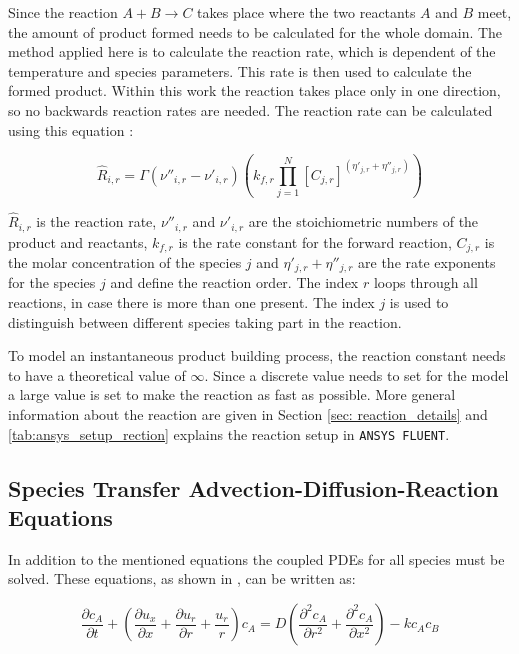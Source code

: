 \documentclass[../thesis.tex]{subfiles}
\begin{document}
Since the reaction $ A + B \rightarrow C$ takes place where the two reactants $A$ and $B$ meet, the amount of product formed needs to be calculated for the whole domain. The method applied here is to calculate the reaction rate, which is dependent of the temperature and species parameters. This rate is then used to calculate the formed product. Within this work the reaction takes place only in one direction, so no backwards reaction rates are needed. The reaction rate can be calculated using this equation \cite{manual2009ansys}:

\begin{equation}
\label{eqn:reaction}
\hat{R}_{i,r} = {\Gamma} \left(\nu''_{i,r} - \nu'_{i,r} \right) \left(k_{f,r} \prod_{j=1}^{N} \left[C_{j,r} \right]^{(\eta'_{j,r} + \eta''_{j,r})} \right) 
\end{equation}

$\hat{R}_{i,r}$ is the reaction rate, $\nu''_{i,r}$ and $\nu'_{i,r}$ are the stoichiometric numbers of the product and reactants, $k_{f,r}$ is the rate constant for the forward reaction, $C_{j,r}$ is the molar concentration of the species $j$ and $\eta'_{j,r} + \eta''_{j,r}$ are the rate exponents for the species $j$ and define the reaction order. 
The index $r$ loops through all reactions, in case there is more than one present. The index $j$ is used to distinguish between different species taking part in the reaction.

To model an instantaneous product building process, the reaction constant needs to have a theoretical value of $\infty$. Since a discrete value needs to set for the model a large value is set to make the reaction as fast as possible. More general information about the reaction are given in Section \ref{sec: reaction_details} and \autoref{tab:ansys_setup_rection} explains the reaction setup in \texttt{ANSYS FLUENT}. 

\subsection{Species Transfer Advection-Diffusion-Reaction Equations}

In addition to the mentioned equations the coupled PDEs for all species must be solved. These equations, as shown in \cite{comolli2021dynamics}, can be written as:

\begin{equation}
	\dfrac{\partial c_A}{\partial t} + \left( \dfrac{\partial u_x}{ \partial x} + \dfrac{\partial u_r}{ \partial r} + \dfrac{u_r}{r} \right) c_A = D \left( \dfrac{\partial^2 c_A} {\partial r^2} + \dfrac{\partial^2 c_A}{\partial x^2} \right)  - kc_A c_B
\end{equation}
\end{document}
